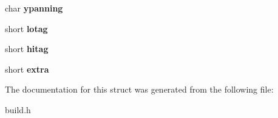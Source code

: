\begin{DoxyCompactItemize}
\item 
char {\bfseries ypanning}\label{structwalltype_a1acaa1720b2c451204e2efd908dcf589}

\item 
short {\bfseries lotag}\label{structwalltype_a902b985bf68ea3561086eaf9c02b514b}

\item 
short {\bfseries hitag}\label{structwalltype_ad630a00ec62f60e95a9ff7924961ad4f}

\item 
short {\bfseries extra}\label{structwalltype_a8e0377dd04ebc4d8a4ddc602f8e06df1}

\end{DoxyCompactItemize}


The documentation for this struct was generated from the following file\-:\begin{DoxyCompactItemize}
\item 
build.\-h\end{DoxyCompactItemize}
